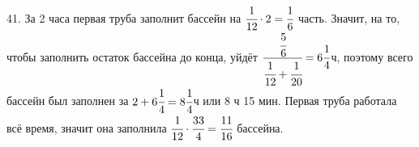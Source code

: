 41. За 2 часа первая труба заполнит бассейн на $\cfrac{1}{12}\cdot2=\cfrac{1}{6}$ часть. Значит, на то, чтобы заполнить остаток бассейна до конца, уйдёт $\cfrac{\cfrac{5}{6}}{\cfrac{1}{12}+\cfrac{1}{20}}=6\cfrac{1}{4}$ч, поэтому всего бассейн был заполнен за $2+6\cfrac{1}{4}=8\cfrac{1}{4}$ч или 8 ч 15 мин. Первая труба работала всё время, значит она заполнила $\cfrac{1}{12}\cdot\cfrac{33}{4}=\cfrac{11}{16}$ бассейна.\\
